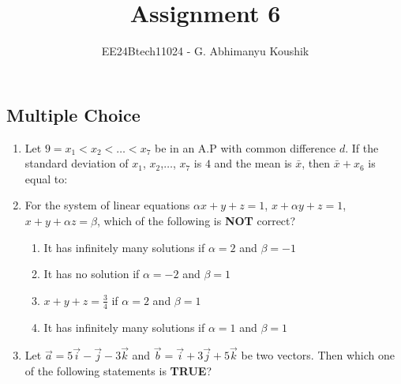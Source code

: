 \documentclass[journal,12pt,onecolumn]{IEEEtran}
\theoremstyle{remark}
\begin{document}
\title{Assignment 6}
\author{EE24Btech11024 - G. Abhimanyu Koushik}
\maketitle
\renewcommand{\thefigure}{\theenumi}
\renewcommand{\thetable}{\theenumi}
\subsection{Multiple Choice}
\begin{enumerate}

\item Let $9=x_1<x_2<\dots <x_7$ be in an A.P with common difference $d$. If the standard deviation of $x_1$, $x_2$,$\dots$, $x_7$ is $4$ and the mean is $\bar{x}$, then $\bar{x}+x_6$ is equal to:

\hfill{}
\begin{enumerate}
\end{enumerate}

\item For the system of linear equations $\alpha x+y+z=1$, $x+\alpha y+z=1$, $x+y+\alpha z=\beta$, which of the following is \textbf{NOT} correct?

\hfill{}
\begin{enumerate}
\item It has infinitely many solutions if $\alpha=2$ and $\beta=-1$
\item It has no solution if $\alpha=-2$ and $\beta=1$
\item $x+y+z=\frac{3}{4}$ if $\alpha=2$ and $\beta=1$
\item It has infinitely many solutions if $\alpha=1$ and $\beta=1$
\end{enumerate}

\item Let $\vec{a}=5\vec{i}-\vec{j}-3\vec{k}$ and $\vec{b}=\vec{i}+3\vec{j}+5\vec{k}$ be two vectors. Then which one of the following statements is \textbf{TRUE}?


\end{enumerate}
\end{document}
